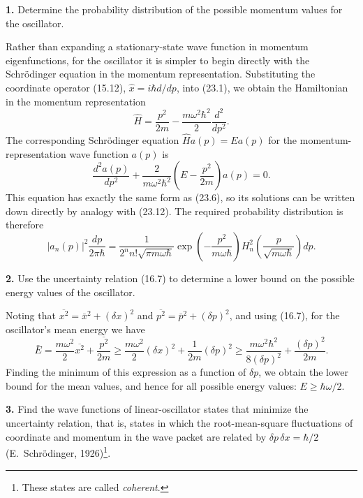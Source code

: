 \ProblemHeading
\noindent\textbf{1.} Determine the probability distribution of the possible
momentum values for the oscillator.

\SolutionHeading
Rather than expanding a stationary-state wave function in momentum
eigenfunctions, for the oscillator it is simpler to begin directly with the
Schrödinger equation in the momentum representation. Substituting the
coordinate operator (15.12),
$\hat x=i\hbar d/dp$, into (23.1), we obtain the Hamiltonian in the momentum
representation
\[
  \hat H=\frac{p^2}{2m}-\frac{m\omega^2\hbar^2}{2}\frac{d^2}{dp^2}.
\]
The corresponding Schrödinger equation $\hat Ha(p)=Ea(p)$ for the
momentum-representation wave function $a(p)$ is
\[
  \frac{d^2a(p)}{dp^2}+\frac{2}{m\omega^2\hbar^2}
  \left(E-\frac{p^2}{2m}\right)a(p)=0.
\]
This equation has exactly the same form as (23.6), so its solutions can be
written down directly by analogy with (23.12). The required probability
distribution is therefore
\[
  |a_n(p)|^2\frac{dp}{2\pi\hbar}
  =\frac{1}{2^nn!\sqrt{\pi m\omega\hbar}}
  \exp\left(-\frac{p^2}{m\omega\hbar}\right)
  H_n^2\left(\frac{p}{\sqrt{m\omega\hbar}}\right)dp.
\]

\ProblemHeading
\noindent\textbf{2.} Use the uncertainty relation (16.7) to determine a lower
bound on the possible energy values of the oscillator.

\SolutionHeading
Noting that $\overline{x^2}=\bar x^2+(\delta x)^2$ and
$\overline{p^2}=\bar p^2+(\delta p)^2$, and using (16.7), for the oscillator's
mean energy we have
\[
  \bar E=\frac{m\omega^2}{2}\overline{x^2}+\frac{\overline{p^2}}{2m}
  \geq\frac{m\omega^2}{2}(\delta x)^2+\frac1{2m}(\delta p)^2
  \geq\frac{m\omega^2\hbar^2}{8(\delta p)^2}+\frac{(\delta p)^2}{2m}.
\]
Finding the minimum of this expression as a function of $\delta p$, we obtain
the lower bound for the mean values, and hence for all possible energy values:
$E\geq\hbar\omega/2$.

\ProblemHeading
\noindent\textbf{3.} Find the wave functions of linear-oscillator states that
minimize the uncertainty relation, that is, states in which the
root-mean-square fluctuations of coordinate and momentum in the wave packet
are related by $\delta p\,\delta x=\hbar/2$ (E.~Schrödinger,
1926)\footnote{These states are called \emph{coherent}.}.

